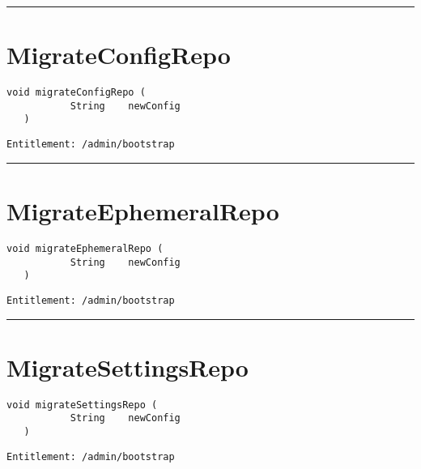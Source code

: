 \rule{12cm}{2pt}
\section{MigrateConfigRepo}
\label{Api:MigrateConfigRepo}
\begin{lstlisting}[style=nonumbers]
   void migrateConfigRepo (
           String    newConfig
   )
\end{lstlisting}
\begin{Verbatim}[formatcom=\color{Maroon}]
  Entitlement: /admin/bootstrap
\end{Verbatim}



\rule{12cm}{2pt}
\section{MigrateEphemeralRepo}
\label{Api:MigrateEphemeralRepo}
\begin{lstlisting}[style=nonumbers]
   void migrateEphemeralRepo (
           String    newConfig
   )
\end{lstlisting}
\begin{Verbatim}[formatcom=\color{Maroon}]
  Entitlement: /admin/bootstrap
\end{Verbatim}



\rule{12cm}{2pt}
\section{MigrateSettingsRepo}
\label{Api:MigrateSettingsRepo}
\begin{lstlisting}[style=nonumbers]
   void migrateSettingsRepo (
           String    newConfig
   )
\end{lstlisting}
\begin{Verbatim}[formatcom=\color{Maroon}]
  Entitlement: /admin/bootstrap
\end{Verbatim}



